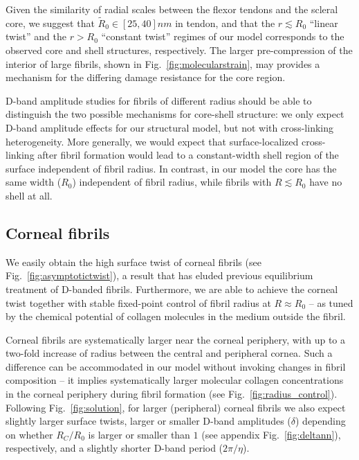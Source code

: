 \documentclass[twoside,twocolumn,9pt]{article}
\begin{document}
Given the similarity of radial scales between the flexor tendons and the scleral core, we suggest that $\tilde{R}_0 \in [25,40]nm$ in tendon, and that the $r \lesssim R_0$ ``linear twist'' and the $r > R_0$ ``constant twist'' regimes of our model corresponds to the observed core and shell structures, respectively. The larger pre-compression of the interior of large fibrils, shown in Fig.~\ref{fig:molecularstrain}, may provides a mechanism for the differing damage resistance for the core region. 

D-band amplitude studies for fibrils of different radius should be able to distinguish the two possible mechanisms for core-shell structure: we only expect D-band amplitude effects for our structural model, but not with cross-linking heterogeneity. More generally, we would expect that surface-localized cross-linking after fibril formation would lead to a constant-width {shell} region of the surface independent of fibril radius. In contrast, in our model the {core} has the same width ($R_0$) independent of fibril radius, while fibrils with $R \lesssim R_0$ have no shell at all. 

\subsection{Corneal fibrils}
We easily obtain the high surface twist of corneal fibrils (see Fig.~\ref{fig:asymptotictwist}), a result that has eluded previous equilibrium treatment of D-banded fibrils.\cite{Cameron:2020} Furthermore, we are able to achieve the corneal twist together with stable fixed-point control of fibril radius at $R \approx R_0$ -- as tuned by the chemical potential of collagen molecules in the medium outside the fibril. 

Corneal fibrils are systematically larger near the corneal periphery, with up to a two-fold increase of radius between the central and peripheral cornea.\cite{Boote:2003} Such a difference can be accommodated in our model without invoking changes in fibril composition -- it implies systematically larger molecular collagen concentrations in the corneal periphery during fibril formation (see Fig.~\ref{fig:radius_control}). Following Fig.~\ref{fig:solution}, for larger (peripheral) corneal fibrils we also expect slightly larger surface twists, larger or smaller D-band amplitudes ($\delta$) depending on whether $R_C/R_0$ is larger or smaller than $1$ (see appendix Fig.~\ref{fig:deltann}), respectively, and a slightly shorter D-band period ($2 \pi/\eta$). 
\end{document}
